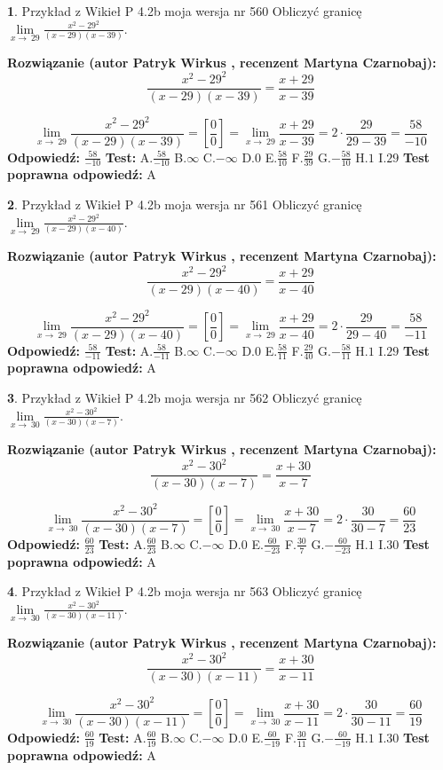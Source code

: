 \documentclass[12pt, a4paper]{article}
\theoremstyle{definition} %
\newtheorem{zad}{}
\newcommand{\zadStart}[1]{\begin{zad}#1\newline}
\newcommand{\zadStop}{\end{zad}}
\newcommand{\rozwStart}[2]{\noindent \textbf{Rozwiązanie (autor #1 , recenzent #2): }\newline}
\newcommand{\rozwStop}{\newline}
\newcommand{\odpStart}{\noindent \textbf{Odpowiedź:}\newline}
\newcommand{\odpStop}{\newline}
\newcommand{\testStart}{\noindent \textbf{Test:}\newline}
\newcommand{\testStop}{\newline}
\newcommand{\kluczStart}{\noindent \textbf{Test poprawna odpowiedź:}\newline}
\newcommand{\kluczStop}{\newline}
\begin{document}
\zadStart{Przykład z Wikieł P 4.2b moja wersja nr 560}
Obliczyć granicę $\lim\limits_{x\to\ 29}\frac{x^{2}-29^{2}}{(x-29)(x-39)}$.
\zadStop
\rozwStart{Patryk Wirkus}{Martyna Czarnobaj}
$$\frac{x^{2}-29^{2}}{(x-29)(x-39)}=\frac{x+29}{x-39}$$

$$\lim\limits_{x\to\ 29}\frac{x^{2}-29^{2}}{(x-29)(x-39)}=[\frac{0}{0}]=\lim\limits_{x\to\ 29}\frac{x+29}{x-39}=2 \cdot \frac{29}{29-39} = \frac{58}{-10}$$
\rozwStop
\odpStart
$\frac{58}{-10}$
\odpStop
\testStart
A.$\frac{58}{-10}$
B.$\infty$
C.$-\infty$
D.$0$
E.$\frac{58}{10}$
F.$\frac{29}{39}$
G.$-\frac{58}{10}$
H.$1$
I.$29$
\testStop
\kluczStart
A
\kluczStop



\zadStart{Przykład z Wikieł P 4.2b moja wersja nr 561}
Obliczyć granicę $\lim\limits_{x\to\ 29}\frac{x^{2}-29^{2}}{(x-29)(x-40)}$.
\zadStop
\rozwStart{Patryk Wirkus}{Martyna Czarnobaj}
$$\frac{x^{2}-29^{2}}{(x-29)(x-40)}=\frac{x+29}{x-40}$$

$$\lim\limits_{x\to\ 29}\frac{x^{2}-29^{2}}{(x-29)(x-40)}=[\frac{0}{0}]=\lim\limits_{x\to\ 29}\frac{x+29}{x-40}=2 \cdot \frac{29}{29-40} = \frac{58}{-11}$$
\rozwStop
\odpStart
$\frac{58}{-11}$
\odpStop
\testStart
A.$\frac{58}{-11}$
B.$\infty$
C.$-\infty$
D.$0$
E.$\frac{58}{11}$
F.$\frac{29}{40}$
G.$-\frac{58}{11}$
H.$1$
I.$29$
\testStop
\kluczStart
A
\kluczStop



\zadStart{Przykład z Wikieł P 4.2b moja wersja nr 562}
Obliczyć granicę $\lim\limits_{x\to\ 30}\frac{x^{2}-30^{2}}{(x-30)(x-7)}$.
\zadStop
\rozwStart{Patryk Wirkus}{Martyna Czarnobaj}
$$\frac{x^{2}-30^{2}}{(x-30)(x-7)}=\frac{x+30}{x-7}$$

$$\lim\limits_{x\to\ 30}\frac{x^{2}-30^{2}}{(x-30)(x-7)}=[\frac{0}{0}]=\lim\limits_{x\to\ 30}\frac{x+30}{x-7}=2 \cdot \frac{30}{30-7} = \frac{60}{23}$$
\rozwStop
\odpStart
$\frac{60}{23}$
\odpStop
\testStart
A.$\frac{60}{23}$
B.$\infty$
C.$-\infty$
D.$0$
E.$\frac{60}{-23}$
F.$\frac{30}{7}$
G.$-\frac{60}{-23}$
H.$1$
I.$30$
\testStop
\kluczStart
A
\kluczStop



\zadStart{Przykład z Wikieł P 4.2b moja wersja nr 563}
Obliczyć granicę $\lim\limits_{x\to\ 30}\frac{x^{2}-30^{2}}{(x-30)(x-11)}$.
\zadStop
\rozwStart{Patryk Wirkus}{Martyna Czarnobaj}
$$\frac{x^{2}-30^{2}}{(x-30)(x-11)}=\frac{x+30}{x-11}$$

$$\lim\limits_{x\to\ 30}\frac{x^{2}-30^{2}}{(x-30)(x-11)}=[\frac{0}{0}]=\lim\limits_{x\to\ 30}\frac{x+30}{x-11}=2 \cdot \frac{30}{30-11} = \frac{60}{19}$$
\rozwStop
\odpStart
$\frac{60}{19}$
\odpStop
\testStart
A.$\frac{60}{19}$
B.$\infty$
C.$-\infty$
D.$0$
E.$\frac{60}{-19}$
F.$\frac{30}{11}$
G.$-\frac{60}{-19}$
H.$1$
I.$30$
\testStop
\kluczStart
A
\kluczStop
\end{document}
